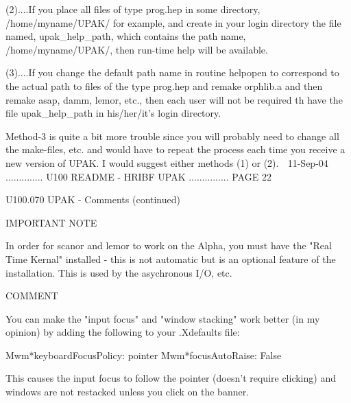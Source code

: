    (2)....If  you  place  all  files  of  type  prog.hep  in  some  directory,
          /home/myname/UPAK/  for  example, and create in your login directory
          the file  named,  upak_help_path,  which  contains  the  path  name,
          /home/myname/UPAK/, then run-time help will be available.
 
   (3)....If  you  change  the  default  path  name  in  routine  helpopen  to
          correspond to the actual path to files  of  the  type  prog.hep  and
          remake  orphlib.a and then remake asap, damm, lemor, etc., then each
          user will not  be  required  th  have  the  file  upak_help_path  in
          his/her/it's login directory.
 
   Method-3  is  quite  a  bit  more  trouble  since you will probably need to
   change all the make-files, etc. and would have to repeat the  process  each
   time  you receive a new version of UPAK. I would suggest either methods (1)
   or (2).
    
   11-Sep-04 .............. U100  README - HRIBF UPAK ............... PAGE  22
 
 
   U100.070  UPAK - Comments (continued)
 
 
 
                                 IMPORTANT NOTE
 
   In order for scanor and lemor to work on  the  Alpha,  you  must  have  the
   "Real  Time  Kernal"  installed  - this is not automatic but is an optional
   feature of the installation. This is used by the asychronous I/O, etc.
 
                                     COMMENT
 
   You can make the "input focus" and "window stacking"  work  better  (in  my
   opinion) by adding the following to your .Xdefaults file:
 
   Mwm*keyboardFocusPolicy:  pointer
   Mwm*focusAutoRaise: False
 
   This  causes  the  input  focus  to  follow  the  pointer  (doesn't require
   clicking) and windows are not restacked unless you click on the banner.
